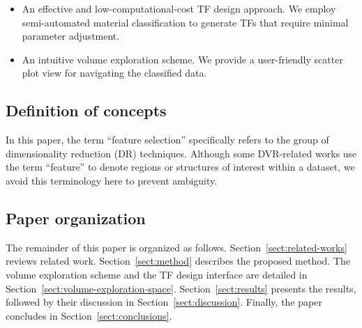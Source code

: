 \begin{itemize}
    \item An effective and low-computational-cost TF design approach. We employ semi-automated material classification to generate TFs that require minimal parameter adjustment.
    \item An intuitive volume exploration scheme. We provide a user-friendly scatter plot view for navigating the classified data.
\end{itemize}

\subsection{Definition of concepts}

In this paper, the term ``feature selection'' specifically refers to the group of dimensionality reduction (DR) techniques. Although some DVR-related works use the term ``feature'' to denote regions or structures of interest within a dataset, we avoid this terminology here to prevent ambiguity.

\subsection{Paper organization}

The remainder of this paper is organized as follows. Section~\ref{sect:related-works} reviews related work. Section~\ref{sect:method} describes the proposed method. The volume exploration scheme and the TF design interface are detailed in Section~\ref{sect:volume-exploration-space}. Section~\ref{sect:results} presents the results, followed by their discussion in Section~\ref{sect:discussion}. Finally, the paper concludes in Section~\ref{sect:conclusions}.
